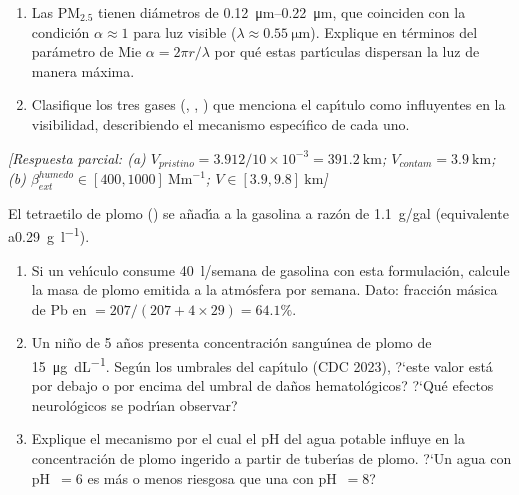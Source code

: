 \begin{bloque_ejercicios}
\begin{ejercicios}
\begin{enumerate}[label=\alph*)]
    \item Las PM$_{2.5}$ tienen di\'ametros de \SIrange{0.12}{0.22}{\micro\metre},
          que coinciden con la condici\'on $\alpha \approx 1$ para luz
          visible ($\lambda \approx \SI{0.55}{\micro\metre}$).
          Explique en t\'erminos del par\'ametro de Mie
          $\alpha = 2\pi r/\lambda$ por qu\'e estas part\'{\i}culas
          dispersan la luz de manera m\'axima.

    \item Clasifique los tres gases (, , )
          que menciona el cap\'{\i}tulo como influyentes en la visibilidad,
          describiendo el mecanismo espec\'{\i}fico de cada uno.
\end{enumerate}

\textit{[Respuesta parcial:
(a) $V_{pristino} = 3.912/10 \times 10^{-3}
    = \SI{391.2}{\kilo\metre}$;
    $V_{contam} = \SI{3.9}{\kilo\metre}$;
(b) $\beta_{ext}^{humedo} \in [400, 1000]\ \text{Mm}^{-1}$;
    $V \in [3.9, 9.8]\ \si{\kilo\metre}$]}

\item El tetraetilo de plomo () se a\~nad\'{\i}a a la gasolina
a raz\'on de \SI{1.1}{\gram}/gal (equivalente a\SI{0.29}{\gram\per\litre}).

\begin{enumerate}[label=\alph*)]
    \item Si un veh\'{\i}culo consume \SI{40}{\litre}/semana de gasolina
          con esta formulaci\'on, calcule la masa de plomo emitida
          a la atm\'osfera por semana. Dato: fracci\'on m\'asica de Pb en
           $= 207/(207 + 4 \times 29) = 64.1\%$.

    \item Un ni\~no de 5 a\~nos presenta concentraci\'on sangu\'{\i}nea de
          plomo de \SI{15}{\micro\gram\per\deci\liter}. Seg\'un los umbrales
          del cap\'{\i}tulo (CDC 2023), ?`este valor est\'a por debajo o
          por encima del umbral de da\~nos hematol\'ogicos?
          ?`Qu\'e efectos neurol\'ogicos se podr\'{\i}an observar?

    \item Explique el mecanismo por el cual el pH del agua potable
          influye en la concentraci\'on de plomo ingerido a partir
          de tuber\'{\i}as de plomo. ?`Un agua con pH~$= 6$ es m\'as o
          menos riesgosa que una con pH~$= 8$?


\end{enumerate}
\end{ejercicios}
\end{bloque_ejercicios}
